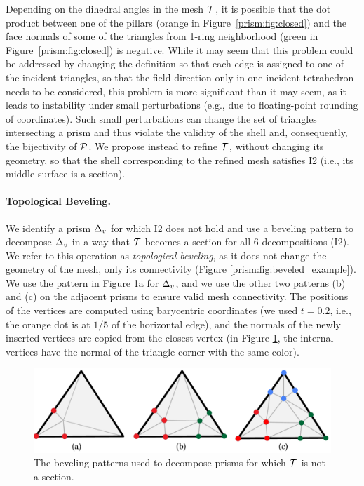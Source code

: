 Depending on the dihedral angles in the mesh $\T$,
it is possible that the dot product between one of the pillars (orange in Figure~\ref{prism:fig:closed}) and the face normals of some of the triangles from 1-ring neighborhood (green in Figure~\ref{prism:fig:closed}) is negative. 
While it may seem that this  problem could be addressed
by changing the definition so that each edge is assigned to one of the incident triangles, so that the field direction only in one incident tetrahedron needs to be considered, this problem is more significant than it may seem, as it leads to instability under small perturbations (e.g., due to floating-point rounding of coordinates). Such small perturbations can change the set of triangles intersecting a prism and thus violate the validity of the shell and, consequently, the bijectivity of $\P$.
We propose instead to refine $\T$, without changing its geometry, so that the shell corresponding to the refined mesh satisfies I2 (i.e., its middle surface is a section).
\paragraph{Topological Beveling.} We identify a prism $\Prism_v$ for which I2 does not hold and use a beveling pattern \cite{coxeter1973regular,conway2016symmetries,hart2018conway}
to decompose $\Prism_v$ in a way that $\T$ becomes a section for all 6 decompositions (I2). We refer to this operation as \emph{topological beveling}, as it does not change the geometry of the mesh, only its connectivity (Figure \ref{prism:fig:beveled_example}). 
We use the pattern in Figure \ref{prism:fig:patterns}a for $\Prism_v$, and we use the other two patterns (b) and (c) on the adjacent prisms to ensure valid mesh connectivity. The positions of the vertices are computed using barycentric coordinates (we used $t = 0.2$, i.e., the orange dot is at $1/5$ of the horizontal edge), and the normals of the newly inserted vertices are copied from the closest vertex (in Figure \ref{prism:fig:patterns}, the internal vertices have the normal of the triangle corner with the same color).

\begin{figure}
    \includegraphics[width=0.9\linewidth]{prism-tex/figs/bevel}
    \caption{The beveling patterns used to decompose prisms for which $\T$ is not a section.}
    \label{prism:fig:patterns}
    
\end{figure}

